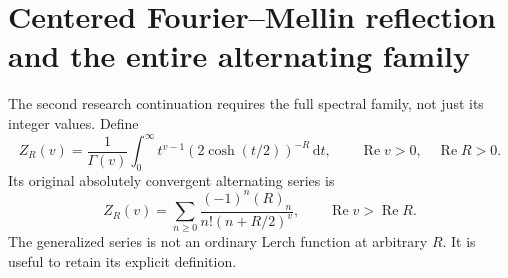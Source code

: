 \documentclass[11pt,letterpaper]{article}
\theoremstyle{definition}\newtheorem{definition}[theorem]{Definition}
\theoremstyle{remark}\newtheorem{remark}[theorem]{Remark}
\newcommand{\Rea}{\operatorname{Re}}\newcommand{\Ima}{\operatorname{Im}}
\newcommand{\dd}{\,\mathrm d}\newcommand{\M}{\mathcal M}
\begin{document}
\section{Centered Fourier--Mellin reflection and the entire alternating family}
\label{mr:sec:centered}
The second research continuation requires the full spectral family,
not just its integer values. Define
\begin{equation}\label{mr:eq:Z}
 Z_R(v)=\frac1{\Gamma(v)}\int_0^\infty
 t^{v-1}(2\cosh(t/2))^{-R}\dd t,\qquad\Rea v>0,\quad\Rea R>0.
\end{equation}
Its original absolutely convergent alternating series is
\begin{equation}\label{mr:eq:Zseries}
 Z_R(v)=\sum_{n\ge0}\frac{(-1)^n(R)_n}{n!(n+R/2)^v},
 \qquad\Rea v>\Rea R.
\end{equation}
The generalized series is not an ordinary Lerch function at arbitrary
$R$. It is useful to retain its explicit definition.
\end{document}
